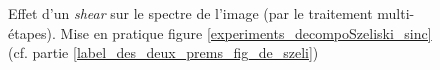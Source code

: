 \begin{figure}
		\caption{Effet d'un \emph{shear} sur le spectre de l'image (par le traitement multi-étapes). Mise en pratique figure \ref{experiments_decompoSzeliski_sinc}(cf. partie \ref{label_des_deux_prems_fig_de_szeli})}
		\label{szeliski_decompoSzeliski }
	\end{figure}
	
